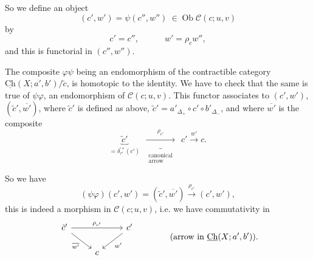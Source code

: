 \documentclass[11pt]{article}
\newcommand{\msp}[1]{\marginpar{\footnotesize [#1]}}
\newcommand{\Ch}{\underline{\mathrm{Ch}}}
\newcommand{\cC}{\mathcal{C}}
\newcommand{\Ob}{\operatorname{Ob}}
\begin{document}
\msp{page 165}
So we define an object
\[
(c',w') = \psi(c'',w'')\ \in \Ob \cC(c;u,v)
\]
by
\[
c' = c'', \qquad\quad w' = \rho_c w'',
\]
and this is functorial in $(c'',w'')$.

The composite $\varphi\psi$ being an endomorphism of the contractible category $\Ch(X;a',b')/\tilde{c}$, is homotopic to the identity. We have to check that the same is true of $\psi\varphi$, an endomorphism of $\cC(c;u,v)$. This functor associates to $(c',w')$, $(\tilde{c}',\overline{w'})$, where $\tilde{c}'$ is defined as above, $\tilde{c}' = a'_{\Delta_{+}} \circ c' \circ b'_{\Delta_{-}}$, and where $\overline{w'}$ is the composite
\[
\underbrace{\tilde{c}'}_{= \delta^{\prime *}_{\tau'}(c')}\ \ \underbrace{\xrightarrow{\ \rho_{c'}\ }}_{\substack{\text{canonical}\\ \text{arrow}}}\ \ c' \xrightarrow{w'} c.
\]

So we have
\[
(\psi\varphi)(c',w') = (\tilde{c}',\overline{w'}) \xrightarrow{\rho_{c'}} (c',w'),
\]
this is indeed a morphism in $\cC(c;u,v)$, i.e. we have commutativity in
\[
\begin{tikzcd}
\tilde{c}' \ar[rr,"\rho_{c'}"] \ar[dr,"\overline{w'}"'] & & c' \ar[dl,"w'"] \\
& c &
\end{tikzcd}
\qquad\qquad \text{(arrow in } \Ch(X;a',b')\text{).}
\]
\end{document}
